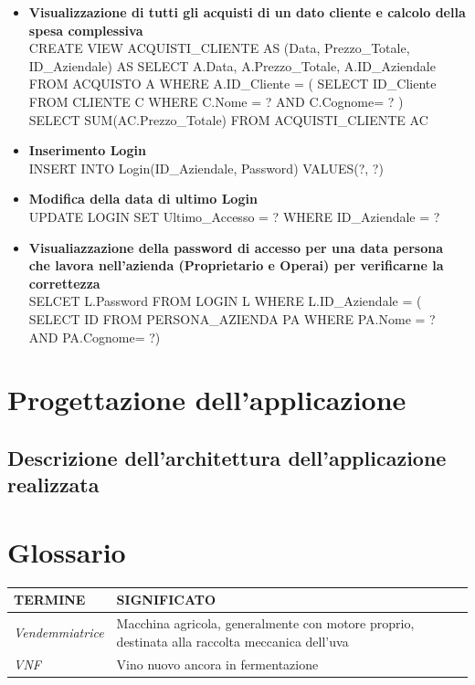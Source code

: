 \documentclass{article}
\begin{document}
\begin{itemize}
\item \textbf{Visualizzazione di tutti gli acquisti di un dato cliente  e calcolo della spesa complessiva }\\\newline
CREATE VIEW ACQUISTI\_CLIENTE AS (Data, Prezzo\_Totale,  ID\_Aziendale) 
AS SELECT A.Data, A.Prezzo\_Totale, A.ID\_Aziendale FROM ACQUISTO A WHERE A.ID\_Cliente = ( SELECT ID\_Cliente FROM CLIENTE C WHERE C.Nome = ? AND C.Cognome= ?  ) \\\newline
SELECT SUM(AC.Prezzo\_Totale) FROM ACQUISTI\_CLIENTE AC \\\newline
\item \textbf{Inserimento Login}\\\newline
INSERT INTO Login(ID\_Aziendale, Password) VALUES(?, ?)\\\newline
\item \textbf{Modifica della data di ultimo Login}\\\newline
UPDATE LOGIN SET Ultimo\_Accesso = ? WHERE ID\_Aziendale = ? \\\newline
\item \textbf{Visualiazzazione della password di accesso per una data persona che lavora nell'azienda (Proprietario e Operai) per verificarne la correttezza }\\\newline
SELCET L.Password FROM LOGIN L WHERE L.ID\_Aziendale = ( SELECT ID FROM PERSONA\_AZIENDA PA WHERE PA.Nome = ? AND PA.Cognome= ?)\\\newline

\end{itemize}

\newpage
\section{Progettazione dell'applicazione}
\subsection{Descrizione dell'architettura dell'applicazione realizzata}

\section{Glossario}
\begin{tabular}{lp{}}\hline
     \textbf{TERMINE} & \textbf{SIGNIFICATO} \\\hline
     \textit{Vendemmiatrice} & Macchina agricola, generalmente con motore proprio, destinata alla raccolta meccanica dell'uva  \\ \hline
     \textit{VNF} & Vino nuovo ancora in fermentazione  
\end{tabular}
 
\end{document}
